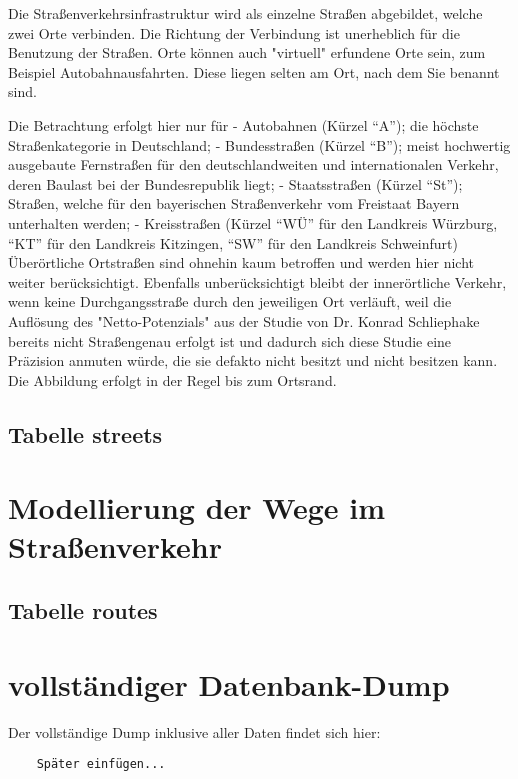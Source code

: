 \documentclass[fontsize=12pt,a4paper]{scrreprt}
\begin{document}
Die Straßenverkehrsinfrastruktur wird als einzelne Straßen abgebildet, welche zwei Orte verbinden. Die Richtung der Verbindung ist unerheblich für die Benutzung der Straßen. Orte können auch "virtuell" erfundene Orte sein, zum Beispiel Autobahnausfahrten. Diese liegen selten am Ort, nach dem Sie benannt sind.

Die Betrachtung erfolgt hier nur für\newline
- Autobahnen (Kürzel \enquote{A}); die höchste Straßenkategorie in Deutschland;\newline
- Bundesstraßen (Kürzel \enquote{B}); meist hochwertig ausgebaute Fernstraßen für den deutschlandweiten und internationalen Verkehr, deren Baulast bei der Bundesrepublik liegt;\newline
- Staatsstraßen (Kürzel \enquote{St}); Straßen, welche für den bayerischen Straßenverkehr vom Freistaat Bayern unterhalten werden;\newline
- Kreisstraßen (Kürzel \enquote{WÜ} für den Landkreis Würzburg, \enquote{KT} für den Landkreis Kitzingen, \enquote{SW} für den Landkreis Schweinfurt)\newline
\newline
Überörtliche Ortstraßen sind ohnehin kaum betroffen und werden hier nicht weiter berücksichtigt.\newline
\newline
Ebenfalls unberücksichtigt bleibt der innerörtliche Verkehr, wenn keine Durchgangsstraße durch den jeweiligen Ort verläuft, weil die Auflösung des "Netto-Potenzials" aus der Studie von Dr. Konrad Schliephake bereits nicht Straßengenau erfolgt ist und dadurch sich diese Studie eine Präzision anmuten würde, die sie defakto nicht besitzt und nicht besitzen kann. Die Abbildung erfolgt in der Regel bis zum Ortsrand.

\subsection{Tabelle streets}

\section{Modellierung der Wege im Straßenverkehr}

\subsection{Tabelle routes}

\section{vollständiger Datenbank-Dump}
Der vollständige Dump inklusive aller Daten findet sich hier:
    \begin{verbatim}
    Später einfügen...
    \end{verbatim}
\end{document}
